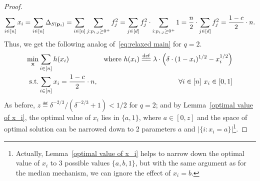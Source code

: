 \begin{proof}
\begin{equation}
    \label{eq: consistency relaxed_median_constraint}
    \sum\limits_{i\in[n]}x_i=\sum\limits_{i\in[n]}\energy[S(\loci)]=
    \sum_{i\in[n]}\sum_{j:p_{i,j}\ge 0^+}f_j^2
    =\sum_{j\in[d]}f_j^2\cdot\sum_{i:p_{i,j}\ge 0^+}1
    =\frac{n}{2}\cdot\sum_{j\in[d]}f_j^2=\frac{1-c}{2}\cdot n.
\end{equation}
Thus, we get the following analog of~\eqref{eq:relaxed main} for $q=2$.
\begin{align}
 \label{eq:consistency relaxed main}
 \min\limits_{\vx}& \sum_{i\in[n]} h(x_i)
 &\text{where }h(x_i)
 \eqdef \lambda\cdot\left(\delta\cdot(1-x_i)^{1/2}- x_i^{1/2}\right)\nonumber\\
 \text{s.t.}&  \sum_{i\in [n]}x_i = \frac{1-c}{2}\cdot n,&
\forall i\in[n]~x_i\in[0,1]
\end{align}
As before, $z\eqdef\delta^{-2/3}/(\delta^{-2/3}+1)<1/2$ for $q=2$; and by Lemma~\ref{optimal value of x_i}, the optimal value of $x_i$ lies in $\{ a,1\}$, where $a\in[0,z]$ and the space of optimal solution can be narrowed down to 2 parameters $a$ and $|\{i: x_i=a\}|$\footnote{Actually, Lemma~\ref{optimal value of x_i} helps to narrow down the optimal value of $x_i$ to 3 possible values $\{a,b,1\}$, but with the same argument as for the median mechanism, we can ignore the effect of $x_i=b$.}. 


\end{proof}
